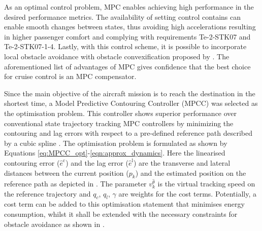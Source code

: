 As an optimal control problem, MPC enables achieving high performance in the desired performance metrics.
The availability of setting control contains can enable smooth changes between states, thus avoiding high accelerations resulting in higher passenger comfort and complying with requirements Te-2-STK07 and Te-2-STK07-1-4.
Lastly, with this control scheme, it is possible to incorporate local obstacle avoidance with obstacle convexification proposed by \cite{convexification}.
The aforementioned list of advantages of MPC gives confidence that the best choice for cruise control is an MPC compensator.

Since the main objective of the aircraft mission is to reach the destination in the shortest time, a Model Predictive Contouring Controller (MPCC) was selected as the optimisation problem.
This controller shows superior performance over conventional state trajectory tracking MPC controllers by minimizing the contouring and lag errors with respect to a pre-defined reference path described by a cubic spline \cite{MPCC}.
The optimisation problem is formulated as shown by Equations \ref{eq:MPCC_opt}-\ref{eqn:approx_dynamics}.
Here the linearised contouring error ($\hat{e}^\mathrm{c}$) and the lag error ($\hat{e}^\mathrm{l}$) are the transverse and lateral distances between the current position ($p_k$) and the estimated position on the reference path as depicted in .
The parameter $v_k^{\hat{\theta}}$ is the virtual tracking speed on the reference trajectory and $q_c$, $q_l$, $\gamma$ are weights for the cost terms.
Potentially, a cost term can be added to this optimisation statement that minimises energy consumption, whilst it shall be extended with the necessary constraints for obstacle avoidance as shown in \cite{convexification}.

